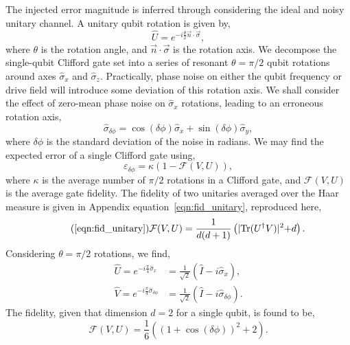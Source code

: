 The injected error magnitude is inferred through considering the ideal and noisy unitary channel. 
A unitary qubit rotation is given by,
\begin{equation}
\hat{U} = e^{-i\frac{\theta}{2}\vec n \cdot \vec \sigma},
\end{equation}
where $\theta$ is the rotation angle, and $\vec n \cdot \vec \sigma$ is the rotation axis. 
We decompose the single-qubit Clifford gate set into a series of resonant $\theta=\pi/2$ qubit rotations around axes 
$\hat{\sigma}_x$ and $\hat{\sigma}_z$. Practically, phase noise on either the qubit frequency or drive field will introduce some deviation of this rotation axis. We shall consider the effect of zero-mean phase noise on $\hat{\sigma}_x$ rotations, leading to an erroneous rotation axis,
\begin{equation}
\hat{\sigma}_{\delta\phi} = \cos(\delta\phi)\hat{\sigma}_x + \sin(\delta\phi)\hat{\sigma}_y,
\end{equation}
where $\delta\phi$ is the standard deviation of the noise in radians. We may find the expected error of a single Clifford gate using,
\begin{equation}
\varepsilon_{\delta\phi} = \kappa\left(1-\mathcal{F}(V, U)\right),
\end{equation}
where $\kappa$ is the average number of $\pi/2$ rotations in a Clifford gate, and $\mathcal{F}(V,U)$ is the average gate fidelity. The fidelity of two unitaries averaged over the Haar measure is given in Appendix equation~\ref{eqn:fid_unitary}, reproduced here,
\begin{equation}
    \tag{\ref{eqn:fid_unitary}}
    \mathcal{F}(V,U) = \frac{1}{d(d+1)} \left( \lvert\text{Tr}(U^\dagger V)\lvert^2 + d \right).
\end{equation}
Considering $\theta=\pi/2$ rotations, we find,
\begin{subequations}
\begin{align}
    \hat{U} = e^{-i\frac{\pi}{4}\hat{\sigma}_x} &= \frac{1}{\sqrt{2}}\left(\hat{I}-i\hat{\sigma}_x\right),\\
    \hat{V} = e^{-i\frac{\pi}{4}\hat{\sigma}_{\delta\phi}} &= \frac{1}{\sqrt{2}}\left(\hat{I}-i\hat{\sigma}_{\delta\phi}\right).
\end{align}
\end{subequations}
The fidelity, given that dimension $d=2$ for a single qubit, is found to be,
\begin{equation}
    \mathcal{F}(V,U) = \frac{1}{6} \left( \left(1+\cos\left(\delta\phi\right)\right)^2 + 2 \right).
\end{equation}
